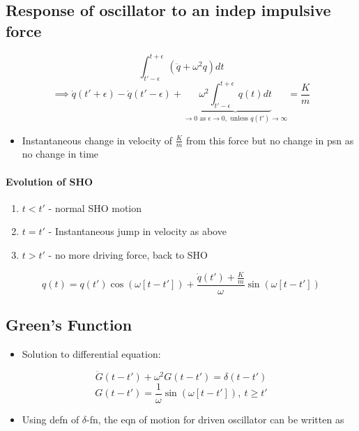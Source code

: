 \documentclass[a4paper,11pt,normalem]{article}
\begin{document}
\subsection{Response of oscillator to an indep impulsive force}\label{response-of-oscillator-to-an-indep-impulsive-force}

\[
    \int_{t' - \epsilon}^{t + \epsilon} (\ddot{q} + \omega^{2}q)dt \] \[
    \implies \dot{q}(t' + \epsilon) - \dot{q}(t' - \epsilon) + \underbrace{\omega^{2} \int_{t' - \epsilon}^{t + \epsilon} q(t)dt}_{\to 0 \text{ as } \epsilon \to 0, \text{ unless } q(t') \to \infty} = \frac{K}{m}
\]

\begin{itemize}
\item
  Instantaneous change in velocity of \(\frac{K}{m}\) from this force
  but no change in psn as no change in time
\end{itemize}

\paragraph{Evolution of SHO}\label{evolution-of-sho}

\begin{enumerate}
\item
  \(t < t'\) - normal SHO motion
\item
  \(t = t'\) - Instantaneous jump in velocity as above
\item
  \(t > t'\) - no more driving force, back to SHO
\end{enumerate}

\[
    q(t) = q(t')\cos(\omega[t - t']) + \frac{\dot{q}(t') + \tfrac{K}{m}}{\omega}\sin(\omega[t - t'])
\]

\subsection{Green's Function}\label{greens-function}

\begin{itemize}
\item
  Solution to differential equation:
\end{itemize}

\[
    \ddot{G}(t - t') + \omega^{2}G(t - t') = \delta(t - t') \] \[
    G(t - t') = \frac{1}{\omega}\sin(\omega[t - t']),~ t \geq t'
\]

\begin{itemize}
\item
  Using defn of \(\delta\)-fn, the eqn of motion for driven oscillator
  can be written as
\end{itemize}
\end{document}
